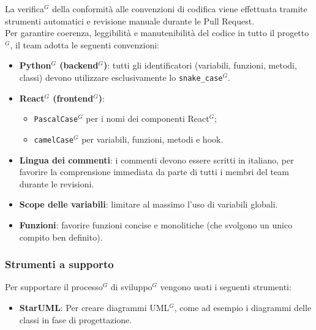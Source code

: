 	La verifica$^G$ della conformità alle convenzioni di codifica viene effettuata tramite strumenti automatici e revisione manuale durante le Pull Request.\\
	Per garantire coerenza, leggibilità e manutenibilità del codice in tutto il progetto$^G$, il team adotta le seguenti convenzioni:
	\begin{itemize}[itemsep=3pt, parsep=1pt, label=\textbullet]
    \item \textbf{Python$^G$ (backend$^G$)}: tutti gli identificatori (variabili, funzioni, metodi, classi) devono utilizzare esclusivamente lo \texttt{snake\_case$^G$}.
    \item \textbf{React$^G$ (frontend$^G$)}:
    \begin{itemize}
        \item \texttt{PascalCase$^G$} per i nomi dei componenti React$^G$;
        \item \texttt{camelCase$^G$} per variabili, funzioni, metodi e hook.
    \end{itemize}
    \item \textbf{Lingua dei commenti}: i commenti devono essere scritti in italiano, per favorire la comprensione immediata da parte di tutti i membri del team durante le revisioni.
    \item \textbf{Scope delle variabili}: limitare al massimo l’uso di variabili globali.
    \item \textbf{Funzioni}: favorire funzioni concise e monolitiche (che svolgono un unico compito ben definito).
\end{itemize}
	
	\subsubsection{Strumenti a supporto}
	\label{sec:strumenti-supporto}
	Per supportare il processo$^G$ di sviluppo$^G$ vengono usati i seguenti strumenti: \vspace{-0.5em}
	\begin{itemize}[itemsep=3pt, parsep=1pt, label=$\scriptstyle\bullet$]
		\item \textbf{StarUML}: Per creare diagrammi UML$^G$, come ad esempio i diagrammi delle classi in fase di progettazione. 
	\end{itemize}

